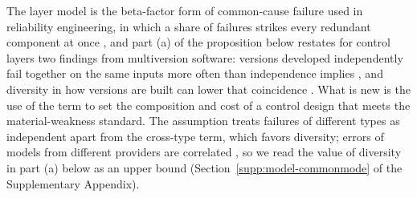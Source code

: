 The layer model is the beta-factor form of common-cause failure used in reliability engineering, in which a share of failures strikes every redundant component at once \citep{hokstad2008common,mosleh1989nureg4780}, and part (a) of the proposition below restates for control layers two findings from multiversion software: versions developed independently fail together on the same inputs more often than independence implies \citep{eckhardt1985theoretical,knight1986experimental}, and diversity in how versions are built can lower that coincidence \citep{littlewood1989conceptual}. What is new is the use of the term to set the composition and cost of a control design that meets the material-weakness standard. The assumption treats failures of different types as independent apart from the cross-type term, which favors diversity; errors of models from different providers are correlated \citep{kim2025correlated}, so we read the value of diversity in part (a) below as an upper bound (Section~\ref{supp:model-commonmode} of the Supplementary Appendix).

